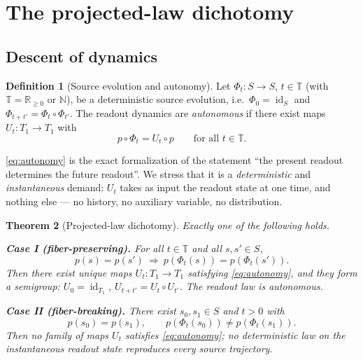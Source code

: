 \documentclass[11pt,reqno]{amsart}
\theoremstyle{plain}
\newtheorem{theorem}{Theorem}[section]
\theoremstyle{definition}
\newtheorem{definition}[theorem]{Definition}
\theoremstyle{remark}
\DeclareMathOperator{\id}{id}
\begin{document}
\section{The projected-law dichotomy}\label{sec:dynamics}

\subsection{Descent of dynamics}

\begin{definition}[Source evolution and autonomy]\label{def:dynamics}
Let $\Phi_t\colon S\to S$, $t\in\mathbb T$ (with $\mathbb T=\mathbb R_{\ge0}$ or $\mathbb N$), be a deterministic source evolution, i.e.\ $\Phi_0=\id_S$ and $\Phi_{t+t'}=\Phi_t\circ\Phi_{t'}$. The readout dynamics are \emph{autonomous} if there exist maps $U_t\colon T_1\to T_1$ with
\begin{equation}\label{eq:autonomy}
p\circ\Phi_t=U_t\circ p\qquad\text{for all }t\in\mathbb T .
\end{equation}
\end{definition}

\eqref{eq:autonomy} is the exact formalization of the statement ``the present readout determines the future readout''. We stress that it is a \emph{deterministic} and \emph{instantaneous} demand: $U_t$ takes as input the readout state at one time, and nothing else --- no history, no auxiliary variable, no distribution.

\begin{theorem}[Projected-law dichotomy]\label{thm:dichotomy}
Exactly one of the following holds.

\textbf{Case I (fiber-preserving).} For all $t\in\mathbb T$ and all $s,s'\in S$,
\begin{equation}\label{eq:caseI}
p(s)=p(s')\ \Longrightarrow\ p(\Phi_t(s))=p(\Phi_t(s')).
\end{equation}
Then there exist unique maps $U_t\colon T_1\to T_1$ satisfying \eqref{eq:autonomy}, and they form a semigroup: $U_0=\id_{T_1}$, $U_{t+t'}=U_t\circ U_{t'}$. The readout law is autonomous.

\textbf{Case II (fiber-breaking).} There exist $s_0,s_1\in S$ and $t>0$ with
\begin{equation}\label{eq:caseII}
p(s_0)=p(s_1),\qquad p(\Phi_t(s_0))\neq p(\Phi_t(s_1)).
\end{equation}
Then \emph{no} family of maps $U_t$ satisfies \eqref{eq:autonomy}; no deterministic law on the instantaneous readout state reproduces every source trajectory.
\end{theorem}
\end{document}
